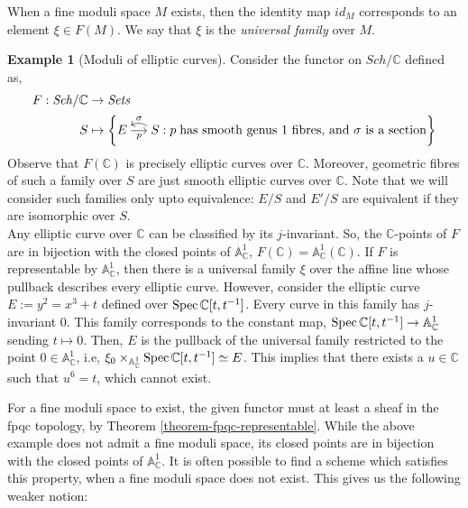 \documentclass[11pt]{amsart}
\newcommand{\Spec}{{\rm Spec \,}}
\newcommand{\A}{{\mathbb A}}
\newcommand{\C}{{\mathbb C}}
\theoremstyle{definition}
\newtheorem{example}[theorem]{Example}
\begin{document}
When a fine moduli space $M$ exists, then the identity map $id_M$ corresponds to an element $\xi \in F(M)$. We say that $\xi$ is the \textit{universal family} over $M$.


\begin{example}[Moduli of elliptic curves]
	Consider the functor on $\mathit{Sch}/\C$ defined as,
	\begin{align*}
	F: \mathit{Sch/\C} &\rightarrow \mathit{Sets}\\
	S & \mapsto \left\{
	\begin{tikzcd}[cramped, column sep=3ex, ampersand replacement=\&]
	E\arrow[r, "p"'] \& S\arrow[l, bend right, "\sigma"']
	\end{tikzcd}
	 : p \;\text{has smooth genus 1 fibres, and $\sigma$ is a section}
	\right\}
	\end{align*}
	Observe that $F(\C)$ is precisely elliptic curves over $\C$. Moreover, geometric fibres of such a family over $S$ are just smooth elliptic curves over $\C$. Note that we will consider such families only upto equivalence: $E/S$ and $E'/S$ are equivalent if they are isomorphic over $S$.\\
	Any elliptic curve over $\C$ can be classified by its $j$-invariant. So, the $\C$-points of $F$ are in bijection with the closed points of $\A^1_{\C}$, $F(\C) = \A^1_{\C}(\C)$. If $F$ is representable by $\A^1_\C$, then there is a universal family $\xi$ over the affine line whose pullback  describes every elliptic curve. However, consider the elliptic curve $E:=y^2=x^3+t$ defined over $\Spec \C[t,t^{-1}]$. Every curve in this family has $j$-invariant 0. This family corresponds to the constant map, $\Spec \C[t,t^{-1}]\rightarrow \A^1_\C$ sending $t\mapsto 0$. Then, $E$ is the pullback of the universal family restricted to the point $0\in \A^1_\C$, i.e, $\xi_0\times_{\A^1_\C}{\Spec \C[t,t^{-1}]}\simeq E$. This implies that there exists a $u\in \C$ such that $u^6=t$, which cannot exist.
\end{example}

For a fine moduli space to exist, the given functor must at least a sheaf in the fpqc topology, by Theorem \ref{theorem-fpqc-representable}. While the above example does not admit a fine moduli space, its closed points are in bijection with the closed points of $\A^1_\C$. It is often possible to find a scheme which satisfies this property, when a fine moduli space does not exist. This gives us the following weaker notion:
\end{document}

